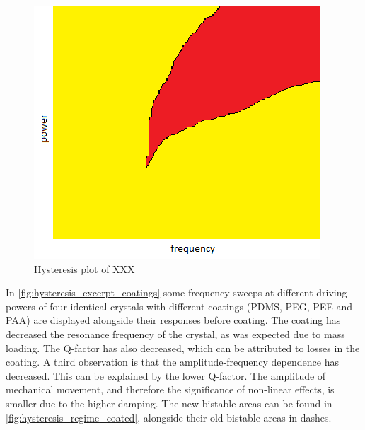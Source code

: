 \begin{figure}
	\centering
		\includegraphics[width=\textwidth]{figures/hysteresis_regime.png}
	\caption{Hysteresis plot of XXX}
	\label{fig:hysteresis_regime}
\end{figure}


In \autoref{fig:hysteresis_excerpt_coatings} some frequency sweeps at different driving powers of four identical crystals with different coatings (PDMS, PEG, PEE and PAA) are displayed alongside their responses before coating. The coating has decreased the resonance frequency of the crystal, as was expected due to mass loading. The Q-factor has also decreased, which can be attributed to losses in the coating. A third observation is that the amplitude-frequency dependence has decreased. This can be explained by the lower Q-factor. The amplitude of mechanical movement, and therefore the significance of non-linear effects, is smaller due to the higher damping. The new bistable areas can be found in \autoref{fig:hysteresis_regime_coated}, alongside their old bistable areas in dashes. 

